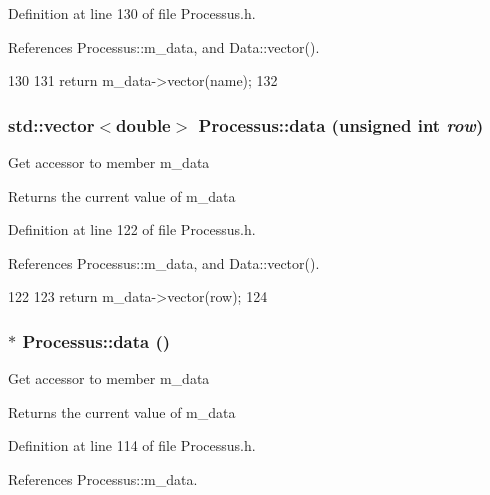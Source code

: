 Definition at line 130 of file Processus.h.

References Processus::m\_\-data, and Data::vector().


\begin{DoxyCode}
130                                         {
131     return m_data->vector(name);
132   }
\end{DoxyCode}
\hypertarget{classProcessus_aa7c57483cf4b9ab0b2d0ae2de8316402}{
\subsubsection[{data}]{\setlength{\rightskip}{0pt plus 5cm}std::vector$<$double$>$ Processus::data (unsigned int {\em row})}}
\label{classProcessus_aa7c57483cf4b9ab0b2d0ae2de8316402}
Get accessor to member m\_\-data \begin{DoxyReturn}{Returns}
the current value of m\_\-data 
\end{DoxyReturn}


Definition at line 122 of file Processus.h.

References Processus::m\_\-data, and Data::vector().


\begin{DoxyCode}
122                                           {
123     return m_data->vector(row);
124   }
\end{DoxyCode}
\hypertarget{classProcessus_a16e45f329fbce935aeef0ff3cb508228}{
\subsubsection[{data}]{$\ast$ Processus::data ()}}
\label{classProcessus_a16e45f329fbce935aeef0ff3cb508228}
Get accessor to member m\_\-data \begin{DoxyReturn}{Returns}
the current value of m\_\-data 
\end{DoxyReturn}


Definition at line 114 of file Processus.h.

References Processus::m\_\-data.

